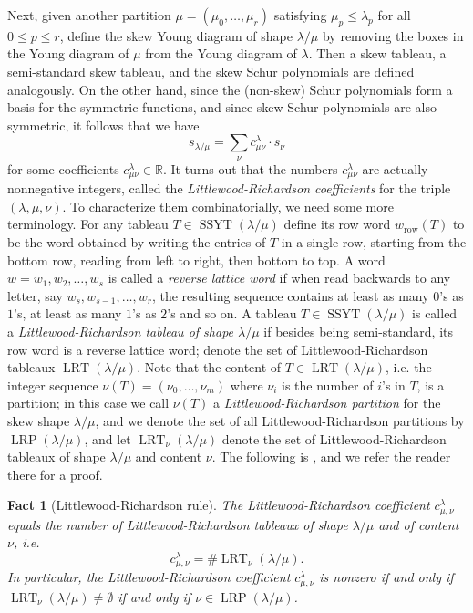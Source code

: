 \documentclass[unnumsec,webpdf,modern,medium]{oup-authoring-template}
\newcommand{\R}{\mathbb{R}}
\theoremstyle{theorem}
\newtheorem{fact}[theorem]{Fact}
\theoremstyle{definition}
\begin{document}
Next, given another partition $\mu=(\mu_0,\ldots,\mu_r)$ satisfying $\mu_p\leq \lambda_p$ for all $0\leq p\leq r$, define the skew Young diagram of shape $\lambda/ \mu$ by removing the boxes in the Young diagram of $\mu$ from the Young diagram of $\lambda$.  Then a skew tableau, a semi-standard skew tableau, and the skew Schur polynomials are defined analogously.  On the other hand, since the (non-skew) Schur polynomials form a basis for the symmetric functions, and since skew Schur polynomials are also symmetric, it follows that we have 
\begin{equation}
	\label{eq:LR}
	s_{\lambda/\mu}=\sum_{\nu}c^{\lambda}_{\mu\nu}\cdot s_{\nu}
\end{equation}   
for some coefficients $c^{\lambda}_{\mu\nu}\in\R$.  It turns out that the numbers $c^{\lambda}_{\mu\nu}$ are actually nonnegative integers, called the \emph{Littlewood-Richardson coefficients} for the triple $(\lambda,\mu,\nu)$.  To characterize them combinatorially, we need some more terminology.  For any tableau $T\in\operatorname{SSYT}(\lambda/\mu)$ define its row word $w_{\text{row}}(T)$ to be the word obtained by writing the entries of $T$ in a single row, starting from the bottom row, reading from left to right, then bottom to top.  A word $w=w_1,w_2,\ldots,w_s$ is called a \emph{reverse lattice word} if when read backwards to any letter, say $w_s,w_{s-1},\ldots,w_r$, the resulting sequence contains at least as many $0$'s as $1$'s, at least as many $1$'s as $2$'s and so on.  A tableau $T\in\operatorname{SSYT}(\lambda/\mu)$ is called  a \emph{Littlewood-Richardson tableau of shape $\lambda/\mu$} if besides being semi-standard, its row word is a reverse lattice word; denote the set of Littlewood-Richardson tableaux $\operatorname{LRT}(\lambda/\mu)$.  Note that the content of $T\in\operatorname{LRT}(\lambda/\mu)$, i.e. the integer sequence $\nu(T)=(\nu_0,\ldots,\nu_m)$ where $\nu_i$ is the number of $i$'s in $T$, is a partition; in this case we call $\nu(T)$ a \emph{Littlewood-Richardson partition} for the skew shape $\lambda/\mu$, and we denote the set of all Littlewood-Richardson partitions by $\operatorname{LRP}(\lambda/\mu)$, and let $\operatorname{LRT}_\nu\left(\lambda/\mu\right)$ denote the set of Littlewood-Richardson tableaux of shape $\lambda/\mu$ and content $\nu$.  The following is \cite[Proposition 3, page 64]{F}, and we refer the reader there for a proof.
\begin{fact}[Littlewood-Richardson rule]
	\label{fact:LRRule}
	The Littlewood-Richardson coefficient $c^{\lambda}_{\mu,\nu}$ equals the number of Littlewood-Richardson tableaux of shape $\lambda/\mu$ and of content $\nu$, i.e.
	$$c^{\lambda}_{\mu,\nu}=\# \operatorname{LRT}_{\nu}(\lambda/\mu).$$  
	In particular, the Littlewood-Richardson coefficient $c^{\lambda}_{\mu,\nu}$ is nonzero if and only if $\operatorname{LRT}_\nu(\lambda/\mu)\neq \emptyset$ if and only if $\nu\in\operatorname{LRP}(\lambda/\mu)$.
\end{fact}
\end{document}
